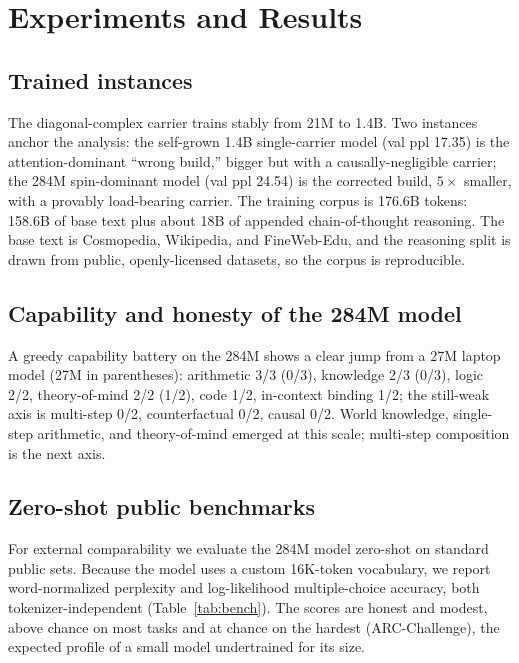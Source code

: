 \documentclass[journal]{IEEEtran}
\begin{document}
\section{Experiments and Results}
\label{sec:experiments}
\subsection{Trained instances}
The diagonal-complex carrier trains stably from 21M to 1.4B. Two instances anchor the analysis: the self-grown 1.4B single-carrier model (val ppl 17.35) is the attention-dominant ``wrong build,'' bigger but with a causally-negligible carrier; the 284M spin-dominant model (val ppl 24.54) is the corrected build, $5\times$ smaller, with a provably load-bearing carrier. The training corpus is 176.6B tokens: 158.6B of base text plus about 18B of appended chain-of-thought reasoning. The base text is Cosmopedia, Wikipedia, and FineWeb-Edu, and the reasoning split is drawn from public, openly-licensed datasets, so the corpus is reproducible.

\subsection{Capability and honesty of the 284M model}
A greedy capability battery on the 284M shows a clear jump from a 27M laptop model (27M in parentheses): arithmetic 3/3 (0/3), knowledge 2/3 (0/3), logic 2/2, theory-of-mind 2/2 (1/2), code 1/2, in-context binding 1/2; the still-weak axis is multi-step 0/2, counterfactual 0/2, causal 0/2. World knowledge, single-step arithmetic, and theory-of-mind emerged at this scale; multi-step composition is the next axis.

\smallskip\noindent{}\smallskip

\subsection{Zero-shot public benchmarks}
For external comparability we evaluate the 284M model zero-shot on standard public sets. Because the model uses a custom 16K-token vocabulary, we report word-normalized perplexity and log-likelihood multiple-choice accuracy, both tokenizer-independent (Table~\ref{tab:bench}). The scores are honest and modest, above chance on most tasks and at chance on the hardest (ARC-Challenge), the expected profile of a small model undertrained for its size.
\end{document}
